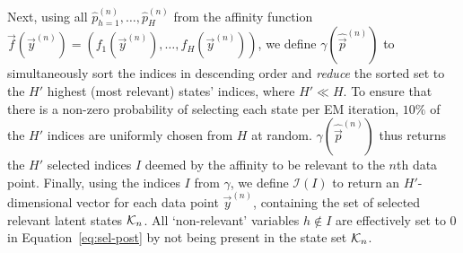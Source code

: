 %
Next, using all $\hat{p}_{h=1}^{(n)},\dots, \hat{p}_H^{(n)}$  
from the affinity function 
$\vec{f}(\vec{y}^{(n)}) = (f_1(\vec{y}^{(n)}), \dots, f_H(\vec{y}^{(n)}))$, we define 
 $\gamma(\hat{\vec{p}}^{(n)})$ to simultaneously sort the indices in descending order and \textit{reduce} the sorted set to the $H'$ highest (most relevant) states' indices, where $H' \ll H$.
To ensure that there is a non-zero probability of selecting each state per EM iteration, $10\%$ of the $H'$ indices are uniformly chosen from $H$ at random.
$\gamma(\hat{\vec{p}}^{(n)})$ thus returns the $H'$ selected indices $I$ deemed by the affinity to be relevant to the $n$th data point.
%
%
%
Finally, using the indices $I$ from $\gamma$, we define $\mathcal{I}(I)$ to return an $H'$-dimensional vector for each data point $\vec{y}^{(n)}$, containing the set of selected relevant latent states $\mathcal{K}_{n}$. 
All `non-relevant' variables $h\not\in I$ are effectively set to $0$ in Equation~\eqref{eq:sel-post} 
by not being present in the state set $\mathcal{K}_{n}$.
%
%

